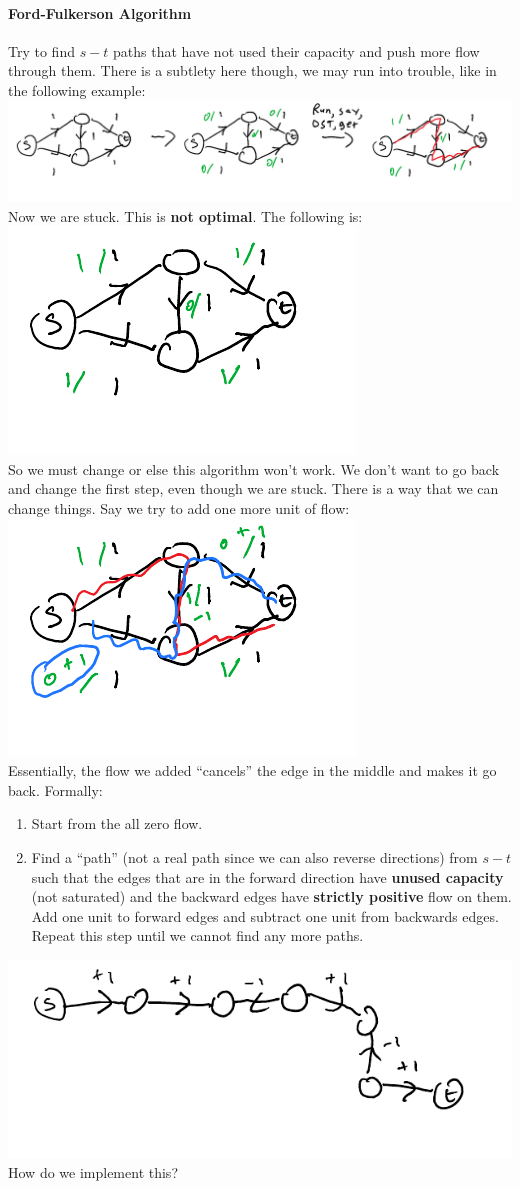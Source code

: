 \documentclass[12 pt]{article}
\begin{document}
        \paragraph{Ford-Fulkerson Algorithm}
        Try to find $s-t$ paths that have not used their capacity and
        push more flow through them. There is a subtlety here
        though, we may run into trouble, like in the following example:
        \\ \includegraphics[width=\textwidth]{i6.pdf}
        \\ Now we are stuck. This is \textbf{not optimal}. The
        following is:
        \\ \includegraphics[width=.3\textwidth]{i7.pdf}
        \\ So we must change or else this algorithm won't work. We
        don't want to go back and change the first step, even though
        we are stuck. There is a way that we can change things. Say we
        try to add one more unit of flow:
        \\ \includegraphics[width=.3\textwidth]{i8.pdf}
        \\ Essentially, the flow we added ``cancels'' the edge in the
        middle and makes it go back. Formally:
        \begin{enumerate}
        \item Start from the all zero flow.
        \item Find a ``path'' (not a real path since we can also
          reverse directions) from $s-t$ such that the edges that are
          in the forward direction have \textbf{unused capacity} (not
          saturated) and the backward edges have \textbf{strictly positive}
          flow on them. Add one unit to forward edges and subtract one
          unit from backwards edges. Repeat this step until we cannot
          find any more paths.
        \end{enumerate}
        \includegraphics[width=.5\textwidth]{i9.pdf}
        \\ How do we implement this?
\end{document}
